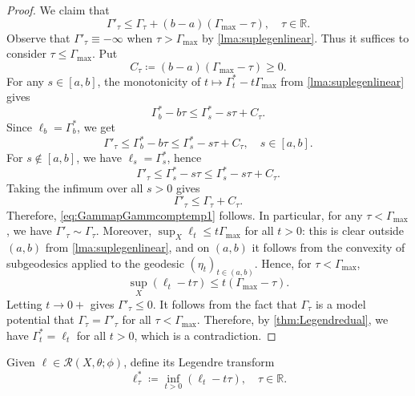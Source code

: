 \begin{proof}
    We claim that
    \begin{equation}\label{eq:GammapGammcomptemp1}
        \Gamma'_{\tau}\leq \Gamma_{\tau}+(b-a)(\Gamma_{\max}-\tau),\quad \tau\in \mathbb{R}.
    \end{equation}
    Observe that $\Gamma'_{\tau}\equiv -\infty$ when $\tau>\Gamma_{\max}$ by \cref{lma:suplegenlinear}. Thus it suffices to consider $\tau\leq \Gamma_{\max}$. Put
    \[
        C_{\tau}\coloneqq (b-a)(\Gamma_{\max}-\tau)\geq 0.
    \]
    For any $s\in [a,b]$, the monotonicity of $t\mapsto \Gamma_t^*-t\Gamma_{\max}$ from \cref{lma:suplegenlinear} gives
    \[
        \Gamma_b^*-b\tau \leq \Gamma_s^*-s\tau+C_{\tau}.
    \]
    Since $\ell_b=\Gamma_b^*$, we get
    \[
        \Gamma'_{\tau}\leq \Gamma_b^*-b\tau\leq \Gamma_s^*-s\tau+C_{\tau},\quad s\in [a,b].
    \]
    For $s\notin [a,b]$, we have $\ell_s=\Gamma_s^*$, hence
    \[
        \Gamma'_{\tau}\leq \Gamma_s^*-s\tau\leq\Gamma_s^*-s\tau+C_{\tau}.
    \]
    Taking the infimum over all $s>0$ gives
    \[
        \Gamma'_{\tau}\leq \Gamma_{\tau}+C_{\tau}.
    \]
    Therefore, \eqref{eq:GammapGammcomptemp1} follows.
    In particular, for any $\tau<\Gamma_{\max}$, we have $\Gamma'_{\tau}\sim \Gamma_{\tau}$.
    Moreover, $\sup_X\ell_t\leq t\Gamma_{\max}$ for all $t>0$: this is clear outside $(a,b)$ from \cref{lma:suplegenlinear}, and on $(a,b)$ it follows from the convexity of subgeodesics applied to the geodesic $(\eta_t)_{t\in(a,b)}$. Hence, for $\tau<\Gamma_{\max}$,
    \[
        \sup_X(\ell_t-t\tau)\leq t(\Gamma_{\max}-\tau).
    \]
    Letting $t\to 0+$ gives $\Gamma'_{\tau}\leq 0$. It follows from the fact that $\Gamma_{\tau}$ is a model potential that $\Gamma_{\tau}=\Gamma'_{\tau}$ for all $\tau<\Gamma_{\max}$. Therefore, by \cref{thm:Legendredual}, we have $\Gamma^*_t=\ell_t$ for all $t>0$, which is a contradiction.
\end{proof}
Given $\ell\in \mathcal{R}(X,\theta;\phi)$, define its Legendre transform
    \begin{equation}\label{eq:invLeg}
        \ell^*_{\tau}\coloneqq \inf_{t>0} (\ell_t-t\tau),\quad \tau \in \mathbb{R}.
    \end{equation}

